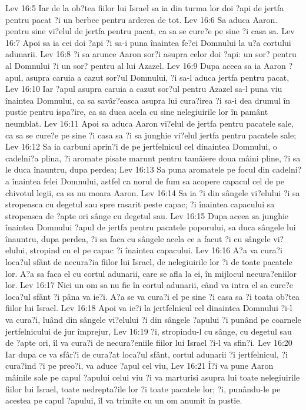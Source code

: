 Lev 16:5  Iar de la ob?tea fiilor lui Israel sa ia din turma lor doi ?api de jertfa pentru pacat ?i un berbec pentru arderea de tot.
Lev 16:6  Sa aduca Aaron. pentru sine vi?elul de jertfa pentru pacat, ca sa se cure?e pe sine ?i casa sa.
Lev 16:7  Apoi sa ia cei doi ?api ?i sa-i puna înaintea fe?ei Domnului la u?a cortului adunarii.
Lev 16:8  ?i sa arunce Aaron sor?i asupra celor doi ?api: un sor? pentru al Domnului ?i un sor? pentru al lui Azazel.
Lev 16:9  Dupa aceea sa ia Aaron ?apul, asupra caruia a cazut sor?ul Domnului, ?i sa-l aduca jertfa pentru pacat,
Lev 16:10  Iar ?apul asupra caruia a cazut sor?ul pentru Azazel sa-l puna viu înaintea Domnului, ca sa savâr?easca asupra lui cura?irea ?i sa-i dea drumul în pustie pentru ispa?ire, ca sa duca acela cu sine nelegiuirile lor în pamânt neumblat.
Lev 16:11  Apoi sa aduca Aaron vi?elul de jertfa pentru pacatele sale, ca sa se cure?e pe sine ?i casa sa ?i sa junghie vi?elul jertfa pentru pacatele sale;
Lev 16:12  Sa ia carbuni aprin?i de pe jertfelnicul cel dinaintea Domnului, o cadelni?a plina, ?i aromate pisate marunt pentru tamâiere doua mâini pline, ?i sa le duca înauntru, dupa perdea;
Lev 16:13  Sa puna aromatele pe focul din cadelni?a înaintea felei Domnului, astfel ca norul de fum sa acopere capacul cel de pe chivotul legii, ca sa nu moara Aaron.
Lev 16:14  Sa ia ?i din sângele vi?elului ?i sa stropeasca cu degetul sau spre rasarit peste capac; ?i înaintea capacului sa stropeasca de ?apte ori sânge cu degetul sau.
Lev 16:15  Dupa aceea sa junghie înaintea Domnului ?apul de jertfa pentru pacatele poporului, sa duca sângele lui înauntru, dupa perdea, ?i sa faca cu sângele acela ce a facut ?i cu sângele vi?elului, stropind cu el pe capac ?i înaintea capacului.
Lev 16:16  A?a va cura?i loca?ul sfânt de necura?ia fiilor lui Israel, de nelegiuirile lor ?i de toate pacatele lor. A?a sa faca el cu cortul adunarii, care se afla la ei, în mijlocul necura?eniilor lor.
Lev 16:17  Nici un om sa nu fie în cortul adunarii, când va intra el sa cure?e loca?ul sfânt ?i pâna va ie?i. A?a se va cura?i el pe sine ?i casa sa ?i toata ob?tea fiilor lui Israel.
Lev 16:18  Apoi va ie?i la jertfelnicul cel dinaintea Domnului ?i-l va cura?i, luând din sângele vi?elului ?i din sângele ?apului ?i punând pe coarnele jertfelnicului de jur împrejur,
Lev 16:19  ?i, stropindu-l cu sânge, cu degetul sau de ?apte ori, îl va cura?i de necura?eniile fiilor lui Israel ?i-l va sfin?i.
Lev 16:20  Iar dupa ce va sfâr?i de cura?at loca?ul sfânt, cortul adunarii ?i jertfelnicul, ?i cura?ind ?i pe preo?i, va aduce ?apul cel viu,
Lev 16:21  Î?i va pune Aaron mâinile sale pe capul ?apului celui viu ?i va marturisi asupra lui toate nelegiuirile fiilor lui Israel, toate nedrepta?ile lor ?i toate pacatele lor; ?i, punându-le pe acestea pe capul ?apului, îl va trimite cu un om anumit în pustie.
